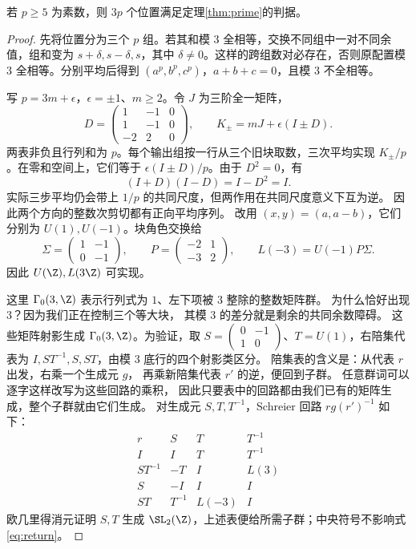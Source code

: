 \begin{proposition}[3p个位置的独立解法]\label{prop:threep}
若 $p\ge5$ 为素数，则 $3p$ 个位置满足定理\ref{thm:prime}的判据。
\end{proposition}
\begin{proof}
先将位置分为三个 $p$ 组。若其和模 $3$ 全相等，交换不同组中一对不同余值，组和变为 $s+\delta,s-\delta,s$，其中 $\delta\ne0$。这样的跨组数对必存在，否则原配置模 $3$ 全相等。分别平均后得到 $(a^p,b^p,c^p)$，$a+b+c=0$，且模 $3$ 不全相等。

写 $p=3m+\epsilon$，$\epsilon=\pm1$、$m\ge2$。令 $J$ 为三阶全一矩阵，
\[
D=\begin{pmatrix}1&-1&0\\1&-1&0\\-2&2&0\end{pmatrix},\qquad
K_\pm=mJ+\epsilon(I\pm D).
\]
两表非负且行列和为 $p$。每个输出组按一行从三个旧块取数，三次平均实现 $K_\pm/p$。在零和空间上，它们等于 $\epsilon(I\pm D)/p$。由于 $D^2=0$，有
\[
(I+D)(I-D)=I-D^2=I.
\]
实际三步平均仍会带上 $1/p$ 的共同尺度，但两作用在共同尺度意义下互为逆。
因此两个方向的整数次剪切都有正向平均序列。
改用 $(x,y)=(a,a-b)$，它们分别为 $U(1),U(-1)$。块角色交换给
\[
\Sigma=\begin{pmatrix}1&-1\\0&-1\end{pmatrix},\qquad
P=\begin{pmatrix}-2&1\\-3&2\end{pmatrix},\qquad
L(-3)=U(-1)P\Sigma.
\]
因此 $U(\Z),L(3\Z)$ 可实现。


这里 $\Gamma_0(3,\Z)$ 表示行列式为 $1$、左下项被 $3$ 整除的整数矩阵群。
为什么恰好出现 $3$？因为我们正在控制三个等大块，
其模 $3$ 的差分就是剩余的共同余数障碍。
这些矩阵射影生成 $\Gamma_0(3,\Z)$。为验证，取 $S=\left(\begin{smallmatrix}0&-1\\1&0\end{smallmatrix}\right)$、$T=U(1)$，右陪集代表为 $I,ST^{-1},S,ST$，由模 $3$ 底行的四个射影类区分。
陪集表的含义是：从代表 $r$ 出发，右乘一个生成元 $g$，
再乘新陪集代表 $r'$ 的逆，便回到子群。
任意群词可以逐字这样改写为这些回路的乘积，
因此只要表中的回路都由我们已有的矩阵生成，整个子群就由它们生成。
对生成元 $S,T,T^{-1}$，Schreier 回路 $rg(r')^{-1}$ 如下：
\[
\begin{array}{c|ccc}
r&S&T&T^{-1}\\\hline
I&I&T&T^{-1}\\
ST^{-1}&-T&I&L(3)\\
S&-I&I&I\\
ST&T^{-1}&L(-3)&I
\end{array}
\]
欧几里得消元证明 $S,T$ 生成 $\SL_2(\Z)$，上述表便给所需子群；中央符号不影响式\eqref{eq:return}。


\end{proof}
